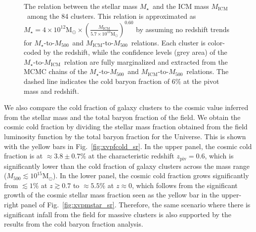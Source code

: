 \documentclass[useAMS,usenatbib,iop,numberedappendix]{mn2e}
\newcommand{\Msun}{\ensuremath{\mathrm{M}_{\odot}}}
\newcommand{\Mfiveoo}{\ensuremath{M_{500}}}
\newcommand{\redshift}{\ensuremath{z}}
\newcommand{\Mstar}{\ensuremath{M_{\star}}}
\newcommand{\Mgas}{\ensuremath{M_{\mathrm{ICM}}}}
\newcommand{\ZPIV}{\ensuremath{z_{\mathrm{piv}}}}
\newcommand{\percent}{\ensuremath{\%}}
\begin{document}
%
\begin{figure}
\centering
{}
\caption{
The relation between the stellar mass \Mstar\ and the ICM mass \Mgas\ among the 84 clusters.
This relation is approximated as 
$\Mstar = 4\times10^{12}\Msun\times\left(  \frac{\Mgas}{5.7\times10^{13}\Msun}\right)^{0.60}$ by assuming no redshift trends for \Mstar-to-\Mfiveoo\ and \Mgas-to-\Mfiveoo\ relations.
Each cluster is color-coded by the redshift, while the confidence levels (grey area) of the \Mstar-to-\Mgas\ relation are fully marginalized and extracted from the MCMC chains of the \Mstar-to-\Mfiveoo\ and \Mgas-to-\Mfiveoo\ relations.
The dashed line indicates the cold baryon fraction of $6\percent$ at the pivot mass and redshift.
}
\label{fig:mstar_mgas}
\end{figure}
%


We also compare the cold fraction of galaxy clusters to the cosmic value inferred from the stellar mass and the total baryon fraction of the field.
We obtain the cosmic cold fraction by dividing the stellar mass fraction obtained from the field luminosity function by the total baryon fraction for the Universe.  This is shown with the yellow bars in Fig.~\ref{fig:xvpfcold_sr}.
In the upper panel, the cosmic cold fraction is at $\approx3.8\pm0.7\percent$ at the characteristic redshift $\ZPIV=0.6$, which is significantly lower than the cold fraction of galaxy clusters across the mass range ($\Mfiveoo\lesssim10^{15}\Msun$).
In the lower panel, the cosmic cold fraction grows significantly from 
$\lesssim1\percent$ at $\redshift\gtrsim0.7$ to $\approx5.5\percent$ at $\redshift\approx0$, 
which follows from the significant growth of the cosmic stellar mass fraction seen as the yellow bar in the upper-right panel of Fig.~\ref{fig:xvpmstar_sr}.
Therefore, the same scenario where there is significant infall from the field for massive clusters is also supported by the results from the cold baryon fraction analysis.
\end{document}
